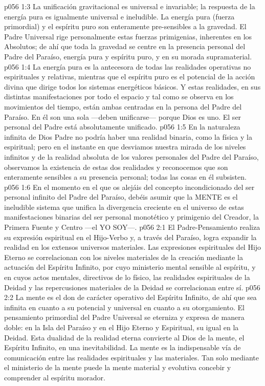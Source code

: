 \vs p056 1:3 La unificación gravitacional es universal e invariable; la respuesta de la energía pura es igualmente universal e ineludible. La energía pura (fuerza primordial) y el espíritu puro son enteramente pre\hyp{}sensibles a la gravedad. El Padre Universal rige personalmente estas fuerzas primigenias, inherentes en los Absolutos; de ahí que toda la gravedad se centre en la presencia personal del Padre del Paraíso, energía pura y espíritu puro, y en su morada supramaterial.
\vs p056 1:4 \pc La energía pura es la antecesora de todas las realidades operativas no espirituales y relativas, mientras que el espíritu puro es el potencial de la acción divina que dirige todos los sistemas energéticos básicos. Y estas realidades, en sus distintas manifestaciones por todo el espacio y tal como se observa en los movimientos del tiempo, están ambas centradas en la persona del Padre del Paraíso. En él son una sola ---deben unificarse--- porque Dios es uno. El ser personal del Padre está absolutamente unificado.
\vs p056 1:5 En la naturaleza infinita de Dios Padre no podría haber una realidad binaria, como la física y la espiritual; pero en el instante en que desviamos nuestra mirada de los niveles infinitos y de la realidad absoluta de los valores personales del Padre del Paraíso, observamos la existencia de estas dos realidades y reconocemos que son enteramente sensibles a su presencia personal; todas las cosas en él subsisten.
\vs p056 1:6 En el momento en el que os alejáis del concepto incondicionado del ser personal infinito del Padre del Paraíso, debéis asumir que la MENTE es el ineludible sistema que unifica la divergencia creciente en el universo de estas manifestaciones binarias del ser personal monotético y primigenio del Creador, la Primera Fuente y Centro ---el YO SOY---.
\vs p056 2:1 El Padre\hyp{}Pensamiento realiza su expresión espiritual en el Hijo\hyp{}Verbo y, a través del Paraíso, logra expandir la realidad en los extensos universos materiales. Las expresiones espirituales del Hijo Eterno se correlacionan con los niveles materiales de la creación mediante la actuación del Espíritu Infinito, por cuyo ministerio mental sensible al espíritu, y en cuyos actos mentales, directivos de lo físico, las realidades espirituales de la Deidad y las repercusiones materiales de la Deidad se correlacionan entre sí.
\vs p056 2:2 La mente es el don de carácter operativo del Espíritu Infinito, de ahí que sea infinita en cuanto a su potencial y universal en cuanto a su otorgamiento. El pensamiento primordial del Padre Universal se eterniza y expresa de manera doble: en la Isla del Paraíso y en el Hijo Eterno y Espiritual, su igual en la Deidad. Esta dualidad de la realidad eterna convierte al Dios de la mente, el Espíritu Infinito, en una inevitabilidad. La mente es la indispensable vía de comunicación entre las realidades espirituales y las materiales. Tan solo mediante el ministerio de la mente puede la mente material y evolutiva concebir y comprender al espíritu morador.

